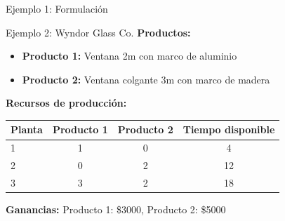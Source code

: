 \documentclass{beamer}
\begin{document}
\begin{frame}{Ejemplo 1: Formulación}
    
    \vspace{1em}
    
\end{frame}

\begin{frame}{Ejemplo 2: Wyndor Glass Co.}
    \textbf{Productos:}
    \begin{itemize}
        \item \textbf{Producto 1:} Ventana 2m con marco de aluminio
        \item \textbf{Producto 2:} Ventana colgante 3m con marco de madera
    \end{itemize}
    
    \vspace{1em}
    \textbf{Recursos de producción:}
    \begin{table}[H]
        \centering
        \tiny
        \begin{tabular}{l|cc|c}
            \textbf{Planta} & \textbf{Producto 1} & \textbf{Producto 2} & \textbf{Tiempo disponible} \\
            \midrule
            1 & 1 & 0 & 4 \\
            2 & 0 & 2 & 12 \\
            3 & 3 & 2 & 18 \\
        \end{tabular}
    \end{table}
    
    \vspace{1em}
    \textbf{Ganancias:} Producto 1: \$3000, Producto 2: \$5000
\end{frame}
\end{document}
